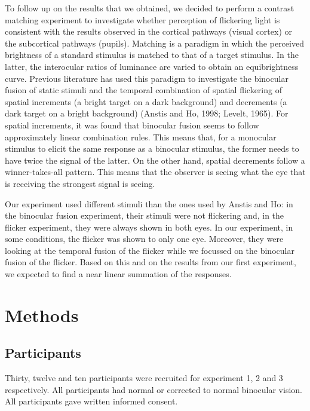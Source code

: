 \documentclass[
]{article}
\begin{document}
To follow up on the results that we obtained, we decided to perform a contrast matching experiment to investigate whether perception of flickering light is consistent with the results observed in the cortical pathways (visual cortex) or the subcortical pathways (pupils). Matching is a paradigm in which the perceived brightness of a standard stimulus is matched to that of a target stimulus. In the latter, the interocular ratios of luminance are varied to obtain an equibrightness curve. Previous literature has used this paradigm to investigate the binocular fusion of static stimuli and the temporal combination of spatial flickering of spatial increments (a bright target on a dark background) and decrements (a dark target on a bright background) (Anstis and Ho, 1998; Levelt, 1965). For spatial increments, it was found that binocular fusion seems to follow approximately linear combination rules. This means that, for a monocular stimulus to elicit the same response as a binocular stimulus, the former needs to have twice the signal of the latter. On the other hand, spatial decrements follow a winner-takes-all pattern. This means that the observer is seeing what the eye that is receiving the strongest signal is seeing.

Our experiment used different stimuli than the ones used by Anstis and Ho: in the binocular fusion experiment, their stimuli were not flickering and, in the flicker experiment, they were always shown in both eyes. In our experiment, in some conditions, the flicker was shown to only one eye. Moreover, they were looking at the temporal fusion of the flicker while we focussed on the binocular fusion of the flicker. Based on this and on the results from our first experiment, we expected to find a near linear summation of the responses.

\hypertarget{methods}{%
\section{Methods}\label{methods}}

\hypertarget{participants}{%
\subsection{Participants}\label{participants}}

Thirty, twelve and ten participants were recruited for experiment 1, 2 and 3 respectively. All participants had normal or corrected to normal binocular vision. All participants gave written informed consent.
\end{document}
